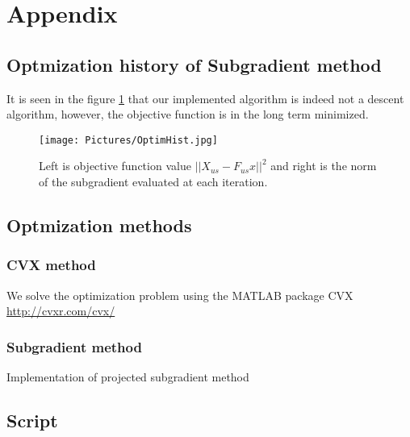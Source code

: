 
\section{Appendix}
\subsection{Optmization history of Subgradient method}
It is seen in the figure \ref{optimhist} that our implemented algorithm is indeed not a descent algorithm, however, the objective function is in the long term minimized.
\begin{figure}[h]
\centering
\texttt{[image: Pictures/OptimHist.jpg]}
\caption{Left is objective function value $||X_{us}-F_{us}x||^2$ and right is the norm of the subgradient evaluated at each iteration. }
\label{optimhist}
\end{figure}
\newpage
\subsection{Optmization methods}

\subsubsection{CVX method}
We solve the optimization problem using the MATLAB package CVX \hyperlink{http://cvxr.com/cvx/}{http://cvxr.com/cvx/} 


\subsubsection{Subgradient method}
Implementation of projected subgradient method


\subsection{Script}
